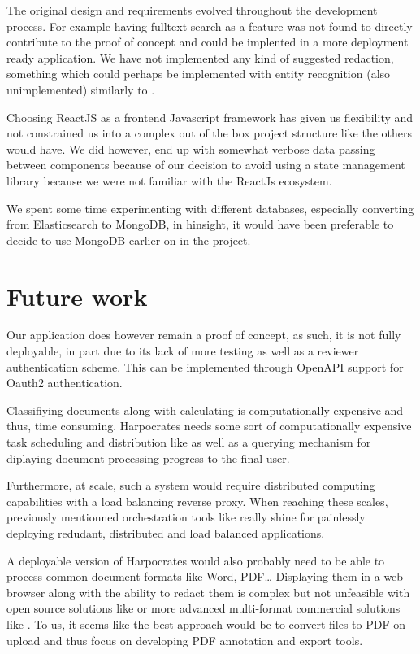 \documentclass[\version]{l4proj}
\begin{document}
The original design and requirements evolved throughout the development process.
For example having fulltext search as a feature was not found to directly contribute to the proof of concept and could be implented in a more deployment ready application.
We have not implemented any kind of suggested redaction, something which could perhaps be implemented with entity recognition (also unimplemented) similarly to \textcite{RedactedAIRemovea}.

Choosing ReactJS as a frontend Javascript framework has given us flexibility and not constrained us into a complex out of the box project structure like the others would have.
We did however, end up with somewhat verbose data passing between components because of our decision to avoid using a state management library because we were not familiar with the ReactJs ecosystem.

We spent some time experimenting with different databases, especially converting from Elasticsearch to MongoDB, in hinsight, it would have been preferable to decide to use MongoDB earlier on in the project.



\section{Future work}

Our application does however remain a proof of concept, as such, it is not fully deployable, in part due to its lack of more testing as well as a reviewer authentication scheme.
This can be implemented through OpenAPI support for Oauth2 authentication.

Classifiying documents along with calculating is computationally expensive and thus, time consuming.
Harpocrates needs some sort of computationally expensive task scheduling and distribution like \textcite{Celery2020} as well as a querying mechanism for diplaying document processing progress to the final user.

Furthermore, at scale, such a system would require distributed computing capabilities with a load balancing reverse proxy.
When reaching these scales, previously mentionned orchestration tools like \textcite{Kubernetes2020} really shine for painlessly deploying redudant, distributed and load balanced applications.

A deployable version of Harpocrates would also probably need to be able to process common document formats like Word, PDF\dots %
Displaying them in a web browser along with the ability to redact them is complex but not unfeasible with open source solutions like \textcite{tyurinAgentcooperReactpdfhighlighter2020} or more advanced multi-format commercial solutions like \textcite{ReactPDFLibrary2020}.
To us, it seems like the best approach would be to convert files to PDF on upload and thus focus on developing PDF annotation and export tools.
\end{document}
